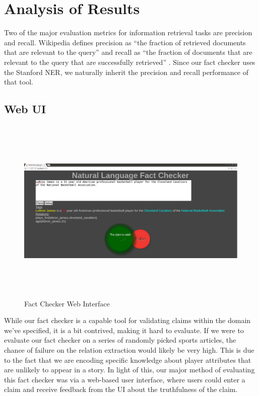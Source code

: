 \documentclass{chi2009}
\begin{document}
\section{Analysis of Results}

Two of the major evaluation metrics for information retrieval tasks are precision and recall.  Wikipedia defines precision as ``the fraction of retrieved documents that are relevant to the query'' \cite{precision} and recall as ``the fraction of documents that are relevant to the query that are successfully retrieved'' \cite{precision}.  Since our fact checker uses the Stanford NER, we naturally inherit the precision and recall performance of that tool.  

\subsection{Web UI}

\begin{figure}
\includegraphics[width=\textwidth,height=9cm]{factcheck}
\caption{Fact Checker Web Interface}\label{imgWeb}
\end{figure}

While our fact checker is a capable tool for validating claims within the domain we've specified, it is a bit contrived, making it hard to evaluate.  If we were to evaluate our fact checker on a series of randomly picked sports articles, the chance of failure on the relation extraction would likely be very high.  This is due to the fact that we are encoding specific knowledge about player attributes that are unlikely to appear in a story.  In light of this, our major method of evaluating this fact checker was via a web-based user interface, where users could enter a claim and receive feedback from the UI about the truthfulness of the claim.  
\end{document}

